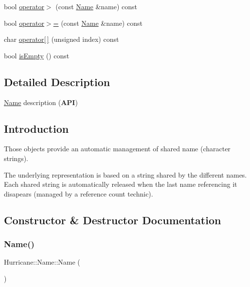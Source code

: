 \begin{DoxyCompactItemize}
\item 
bool \mbox{\hyperlink{classHurricane_1_1Name_a33bd981f4f6923a50c603cd06283032d}{operator$>$}} (const \mbox{\hyperlink{classHurricane_1_1Name}{Name}} \&name) const
\item 
bool \mbox{\hyperlink{classHurricane_1_1Name_a241d0568f16c8ba60d4c5148be6a48b3}{operator$>$=}} (const \mbox{\hyperlink{classHurricane_1_1Name}{Name}} \&name) const
\item 
char \mbox{\hyperlink{classHurricane_1_1Name_a2e6f3869321016de8f98f2b35f136ab4}{operator\mbox{[}$\,$\mbox{]}}} (unsigned index) const
\item 
bool \mbox{\hyperlink{classHurricane_1_1Name_a6c05cf200a0aeb95f98603fa0c9c9d4b}{is\+Empty}} () const
\end{DoxyCompactItemize}


\subsection{Detailed Description}
\mbox{\hyperlink{classHurricane_1_1Name}{Name}} description ({\bfseries A\+PI}) 

\hypertarget{classHurricane_1_1Name_secNameIntro}{}\subsection{Introduction}\label{classHurricane_1_1Name_secNameIntro}
Those objects provide an automatic management of shared name (character strings).

The underlying representation is based on a string shared by the different names. Each shared string is automatically released when the last name referencing it disapears (managed by a reference count technic). 

\subsection{Constructor \& Destructor Documentation}
\mbox{\label{classHurricane_1_1Name_a42636ecb0d4d7d03eb881420a244038b}} 
\subsubsection{\texorpdfstring{Name()}{Name()}\hspace{0.1cm}{\footnotesize\ttfamily [1/4]}}
{\footnotesize\ttfamily Hurricane\+::\+Name\+::\+Name (\begin{DoxyParamCaption}{ }\end{DoxyParamCaption})}

